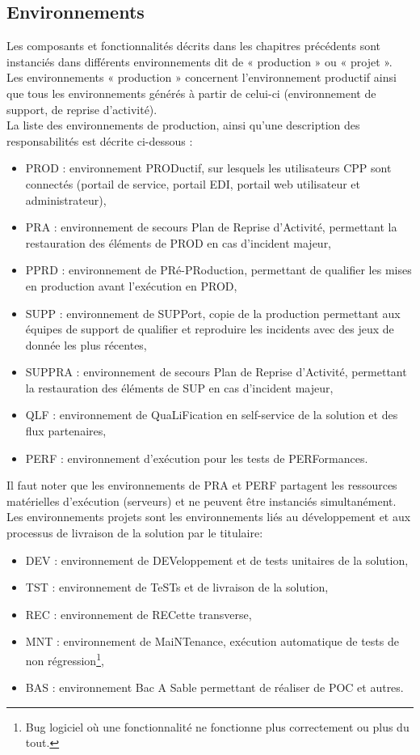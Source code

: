 \documentclass[12pt,a4paper]{article}
\begin{document}
\subsection{Environnements}
Les composants et fonctionnalités décrits dans les chapitres précédents sont instanciés dans différents environnements dit de « production » ou « projet ».\\
Les environnements « production » concernent l’environnement productif ainsi que tous les environnements générés à partir de celui-ci (environnement de support, de reprise d’activité).\\
La liste des environnements de production, ainsi qu’une description des responsabilités est décrite ci-dessous :
\begin{itemize}
\item	PROD : environnement PRODuctif, sur lesquels les utilisateurs CPP sont connectés (portail de service, portail EDI, portail web utilisateur et administrateur),
\item	PRA : environnement de secours Plan de Reprise d’Activité, permettant la restauration des éléments de PROD en cas d’incident majeur,
\item	PPRD : environnement de PRé-PRoduction, permettant de qualifier les mises en production avant l'exécution en PROD,
\item	SUPP : environnement de SUPPort, copie de la production permettant aux équipes de support de qualifier et reproduire les incidents avec des jeux de donnée les plus récentes,
\item	SUPPRA : environnement de secours Plan de Reprise d’Activité, permettant la restauration des éléments de SUP en cas d’incident majeur,
\item	QLF : environnement de QuaLiFication en self-service de la solution et des flux partenaires,
\item	PERF : environnement d’exécution pour les tests de PERFormances.
\end{itemize}
Il faut noter que les  environnements de PRA et PERF partagent les ressources matérielles d'exécution (serveurs) et ne peuvent être instanciés simultanément.
Les environnements projets sont les environnements liés au développement et aux processus de livraison de la solution par le titulaire: 
\begin{itemize}
\item	DEV : environnement de DEVeloppement et de tests unitaires de la solution,
\item	TST : environnement de TeSTs et de livraison de la solution,
\item	REC : environnement de RECette transverse,
\item	MNT : environnement de MaiNTenance, exécution automatique de tests de non régression\footnote{Bug logiciel où une fonctionnalité ne fonctionne plus correctement ou plus du tout.},
\item	BAS : environnement Bac A Sable permettant de réaliser de POC et autres.
\end{itemize}
\clearpage
\newpage
\end{document}
